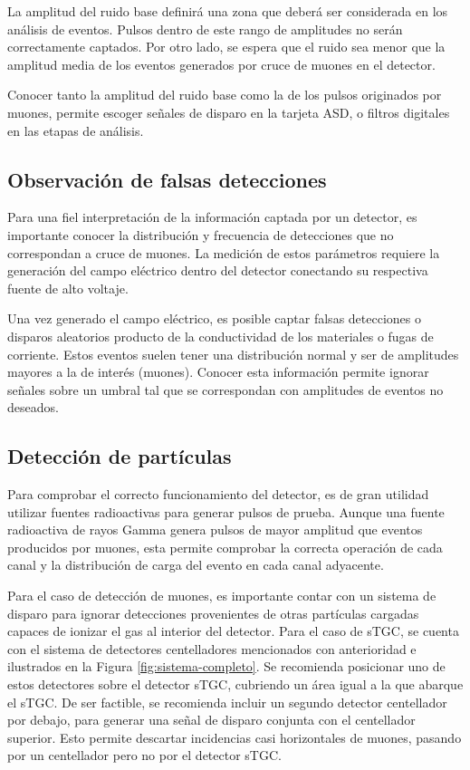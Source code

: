 		La amplitud del ruido base definirá una zona que deberá ser considerada en los análisis de eventos. Pulsos dentro de este rango de amplitudes no serán correctamente captados. Por otro lado, se espera que el ruido sea menor que la amplitud media de los eventos generados por cruce de muones en el detector.
		
		Conocer tanto la amplitud del ruido base como la de los pulsos originados por muones, permite escoger señales de disparo en la tarjeta ASD, o filtros digitales en las etapas de análisis. 
		
	\subsection{Observación de falsas detecciones}
		Para una fiel interpretación de la información captada por un detector, es importante conocer la distribución y frecuencia de detecciones que no correspondan a cruce de muones. La medición de estos parámetros requiere la generación del campo eléctrico dentro del detector conectando su respectiva fuente de alto voltaje.
		
		Una vez generado el campo eléctrico, es posible captar falsas detecciones o disparos aleatorios producto de la conductividad de los materiales o fugas de corriente. Estos eventos suelen tener una distribución normal y ser de amplitudes mayores a la de interés (muones). Conocer esta información permite ignorar señales sobre un umbral tal que se correspondan con amplitudes de eventos no deseados.
	
	\subsection{Detección de partículas}
		Para comprobar el correcto funcionamiento del detector, es de gran utilidad utilizar fuentes radioactivas para generar pulsos de prueba. Aunque una fuente radioactiva de rayos Gamma genera pulsos de mayor amplitud que eventos producidos por muones, esta permite comprobar la correcta operación de cada canal y la distribución de carga del evento en cada canal adyacente.
	
		Para el caso de detección de muones, es importante contar con un sistema de disparo para ignorar detecciones provenientes de otras partículas cargadas capaces de ionizar el gas al interior del detector. Para el caso de sTGC, se cuenta con el sistema de detectores centelladores mencionados con anterioridad e ilustrados en la Figura \ref{fig:sistema-completo}. Se recomienda posicionar uno de estos detectores sobre el detector sTGC, cubriendo un área igual a la que abarque el sTGC. De ser factible, se recomienda incluir un segundo detector centellador por debajo, para generar una señal de disparo conjunta con el centellador superior. Esto permite descartar incidencias casi horizontales de muones, pasando por un centellador pero no por el detector sTGC.
		
